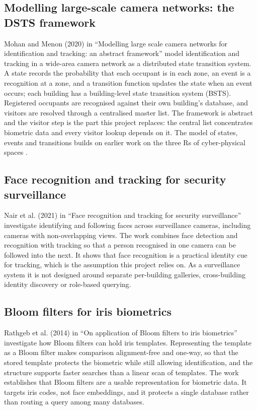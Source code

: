 \documentclass[12pt,a4paper,oneside]{report}
\begin{document}
\subsection{Modelling large-scale camera networks: the DSTS framework}
Mohan and Menon (2020) in ``Modelling large scale camera networks for identification and tracking: an abstract framework'' \cite{ref6} model identification and tracking in a wide-area camera network as a distributed state transition system. A state records the probability that each occupant is in each zone, an event is a recognition at a zone, and a transition function updates the state when an event occurs; each building has a building-level state transition system (BSTS). Registered occupants are recognised against their own building's database, and visitors are resolved through a centralised master list. The framework is abstract and the visitor step is the part this project replaces: the central list concentrates biometric data and every visitor lookup depends on it. The model of states, events and transitions builds on earlier work on the three Rs of cyber-physical spaces \cite{ref7}.

\clearpage
\subsection{Face recognition and tracking for security surveillance}
Nair et al. (2021) in ``Face recognition and tracking for security surveillance'' \cite{ref8} investigate identifying and following faces across surveillance cameras, including cameras with non-overlapping views. The work combines face detection and recognition with tracking so that a person recognised in one camera can be followed into the next. It shows that face recognition is a practical identity cue for tracking, which is the assumption this project relies on. As a surveillance system it is not designed around separate per-building galleries, cross-building identity discovery or role-based querying.

\subsection{Bloom filters for iris biometrics}
Rathgeb et al. (2014) in ``On application of Bloom filters to iris biometrics'' \cite{ref10} investigate how Bloom filters can hold iris templates. Representing the template as a Bloom filter makes comparison alignment-free and one-way, so that the stored template protects the biometric while still allowing identification, and the structure supports faster searches than a linear scan of templates. The work establishes that Bloom filters are a usable representation for biometric data. It targets iris codes, not face embeddings, and it protects a single database rather than routing a query among many databases.
\end{document}
